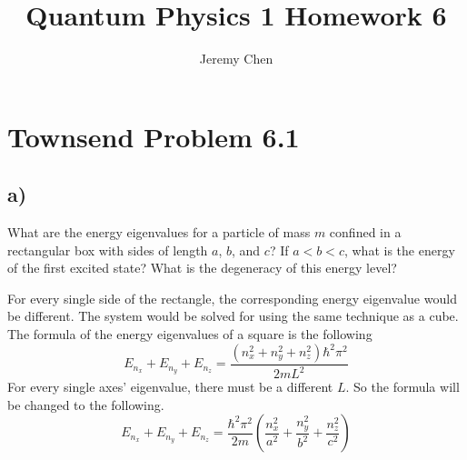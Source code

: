 \documentclass[12pt,letterpaper]{article}
\title{Quantum Physics 1 Homework 6}
\author{Jeremy Chen}
\begin{document}
	\maketitle
	
\section*{Townsend Problem 6.1}
\subsection*{a)}
\noindent What are the energy eigenvalues for a particle of mass $m$ confined in a rectangular box with sides of length $a$, $b$, and $c$? If $a < b < c$, what is the energy of the first excited state? What is the degeneracy of this energy level?

For every single side of the rectangle, the corresponding energy eigenvalue would be different. The system would be solved for using the same technique as a cube. The formula of the energy eigenvalues of a square is the following
$$E_{n_{x}} + E_{n_{y}} + E_{n_{z}} = \frac{(n_{x}^{2} + n_{y}^{2} + n_{z}^{2})\hbar^{2}\pi^{2}}{2mL^{2}}$$
For every single axes' eigenvalue, there must be a different $L$. So the formula will be changed to the following.
$$E_{n_{x}} + E_{n_{y}} + E_{n_{z}} = \frac{\hbar^{2}\pi^{2}}{2m} \left(\frac{n_{x}^{2}}{a^{2}} + \frac{n_{y}^{2}}{b^{2}} + \frac{n_{z}^{2}}{c^{2}}\right)$$
\end{document}
